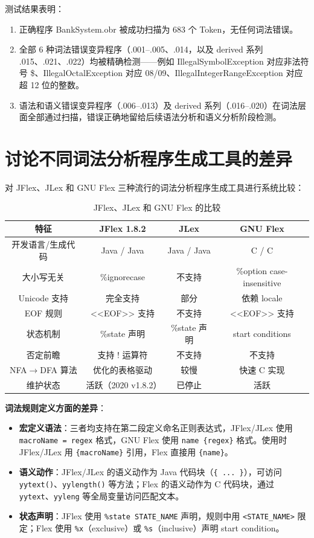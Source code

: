 测试结果表明：
\begin{enumerate}
    \item 正确程序 BankSystem.obr 被成功扫描为 683 个 Token，无任何词法错误。
    \item 全部 6 种词法错误变异程序（.001--.005、.014，以及 derived 系列 .015、.021、.022）均被精确检测——例如 IllegalSymbolException 对应非法符号 \$、IllegalOctalException 对应 08/09、IllegalIntegerRangeException 对应超 12 位的整数。
    \item 语法和语义错误变异程序（.006--.013）及 derived 系列（.016--.020）在词法层面全部通过扫描，错误正确地留给后续语法分析和语义分析阶段检测。
\end{enumerate}

\section{讨论不同词法分析程序生成工具的差异}

对 JFlex、JLex 和 GNU Flex 三种流行的词法分析程序生成工具进行系统比较：

\begin{table}[htbp]
    \centering
    \begin{tabular}{|c|c|c|c|}
    \hline
    \textbf{特征} & \textbf{JFlex 1.8.2} & \textbf{JLex} & \textbf{GNU Flex} \\
    \hline
    开发语言/生成代码 & Java / Java & Java / Java & C / C \\
    大小写无关 & \%ignorecase & 不支持 & \%option case-insensitive \\
    Unicode 支持 & 完全支持 & 部分 & 依赖 locale \\
    EOF 规则 & <<EOF>> 支持 & 不支持 & <<EOF>> 支持 \\
    状态机制 & \%state 声明 & \%state 声明 & start conditions \\
    否定前瞻 & 支持 ! 运算符 & 不支持 & 不支持 \\
    NFA$\to$DFA 算法 & 优化的表格驱动 & 较慢 & 快速 C 实现 \\
    维护状态 & 活跃（2020 v1.8.2） & 已停止 & 活跃 \\
    \hline
    \end{tabular}
    \caption{JFlex、JLex 和 GNU Flex 的比较}
    \label{tab:lex-tools}
\end{table}

\textbf{词法规则定义方面的差异}：
\begin{itemize}
    \item \textbf{宏定义语法}：三者均支持在第二段定义命名正则表达式，JFlex/JLex 使用 \texttt{macroName = regex} 格式，GNU Flex 使用 \texttt{name \{regex\}} 格式。使用时 JFlex/JLex 用 \texttt{\{macroName\}} 引用，Flex 直接用 \texttt{\{name\}}。
    \item \textbf{语义动作}：JFlex/JLex 的语义动作为 Java 代码块（\texttt{\{ ... \}}），可访问 \texttt{yytext()}、\texttt{yylength()} 等方法；Flex 的语义动作为 C 代码块，通过 \texttt{yytext}、\texttt{yyleng} 等全局变量访问匹配文本。
    \item \textbf{状态声明}：JFlex 使用 \texttt{\%state STATE\_NAME} 声明，规则中用 \texttt{<STATE\_NAME>} 限定；Flex 使用 \texttt{\%x}（exclusive）或 \texttt{\%s}（inclusive）声明 start condition。
\end{itemize}

